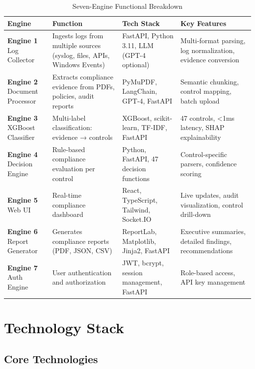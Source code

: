 \documentclass[11pt,conference]{IEEEtran}
\begin{document}
\begin{table}[h]
\centering
\caption{Seven-Engine Functional Breakdown}
\begin{tabular}{p{}p{}p{}p{}}
\toprule
\textbf{Engine} & \textbf{Function} & \textbf{Tech Stack} & \textbf{Key Features} \\
\midrule
\textbf{Engine 1} Log Collector & Ingests logs from multiple sources (syslog, files, APIs, Windows Events) & FastAPI, Python 3.11, LLM (GPT-4 optional) & Multi-format parsing, log normalization, evidence conversion \\
\midrule
\textbf{Engine 2} Document Processor & Extracts compliance evidence from PDFs, policies, audit reports & PyMuPDF, LangChain, GPT-4, FastAPI & Semantic chunking, control mapping, batch upload \\
\midrule
\textbf{Engine 3} XGBoost Classifier & Multi-label classification: evidence → controls & XGBoost, scikit-learn, TF-IDF, FastAPI & 47 controls, <1ms latency, SHAP explainability \\
\midrule
\textbf{Engine 4} Decision Engine & Rule-based compliance evaluation per control & Python, FastAPI, 47 decision functions & Control-specific parsers, confidence scoring \\
\midrule
\textbf{Engine 5} Web UI & Real-time compliance dashboard & React, TypeScript, Tailwind, Socket.IO & Live updates, audit visualization, control drill-down \\
\midrule
\textbf{Engine 6} Report Generator & Generates compliance reports (PDF, JSON, CSV) & ReportLab, Matplotlib, Jinja2, FastAPI & Executive summaries, detailed findings, recommendations \\
\midrule
\textbf{Engine 7} Auth Engine & User authentication and authorization & JWT, bcrypt, session management, FastAPI & Role-based access, API key management \\
\bottomrule
\end{tabular}
\end{table}

\section{Technology Stack}

\subsection{Core Technologies}
\end{document}
